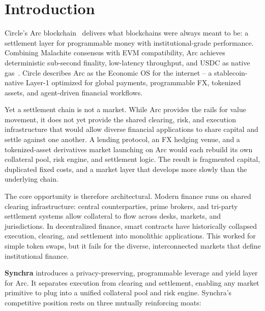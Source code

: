 \documentclass[11pt,a4paper]{article}
\begin{document}
\newpage
\tableofcontents
\newpage

\section{Introduction}
\label{sec:introduction}

Circle's Arc blockchain~\cite{circlearc} delivers what blockchains were always meant to be: a settlement layer for programmable money with institutional-grade performance. Combining Malachite consensus with EVM compatibility, Arc achieves deterministic sub-second finality, low-latency throughput, and USDC as native gas~\cite{arc_technical}. Circle describes Arc as the Economic OS for the internet -- a stablecoin-native Layer-1 optimized for global payments, programmable FX, tokenized assets, and agent-driven financial workflows.

Yet a settlement chain is not a market. While Arc provides the rails for value movement, it does not yet provide the shared clearing, risk, and execution infrastructure that would allow diverse financial applications to share capital and settle against one another. A lending protocol, an FX hedging venue, and a tokenized-asset derivatives market launching on Arc would each rebuild its own collateral pool, risk engine, and settlement logic. The result is fragmented capital, duplicated fixed costs, and a market layer that develops more slowly than the underlying chain.

The core opportunity is therefore architectural. Modern finance runs on shared clearing infrastructure: central counterparties, prime brokers, and tri-party settlement systems allow collateral to flow across desks, markets, and jurisdictions. In decentralized finance, smart contracts have historically collapsed execution, clearing, and settlement into monolithic applications. This worked for simple token swaps, but it fails for the diverse, interconnected markets that define institutional finance.

\textbf{Synchra} introduces a privacy-preserving, programmable leverage and yield layer for Arc. It separates execution from clearing and settlement, enabling any market primitive to plug into a unified collateral pool and risk engine. Synchra's competitive position rests on three mutually reinforcing moats:
\end{document}
